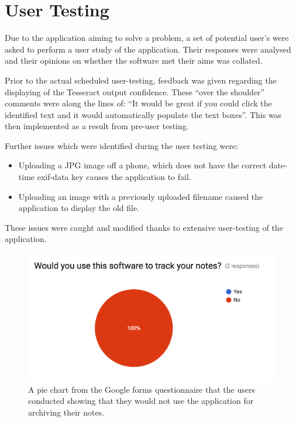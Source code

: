 \section{User Testing}
Due to the application aiming to solve a problem, a set of potential user's were asked to perform a user study of the application. Their responses were analysed and their opinions on whether the software met their aims was collated.

Prior to the actual scheduled user-testing, feedback was given regarding the displaying of the Tesseract output confidence. These ``over the shoulder'' comments were along the lines of: ``It would be great if you could click the identified text and it would automatically populate the text boxes''. This was then implemented as a result from pre-user testing.

Further issues which were identified during the user testing were:
\begin{itemize}
  \item Uploading a JPG image off a phone, which does not have the correct date-time exif-data key causes the application to fail.
  \item Uploading an image with a previously uploaded filename caused the application to display the old file.
\end{itemize}

These issues were caught and modified thanks to extensive user-testing of the application.

\begin{figure}[h!]
  \centering
  \includegraphics[scale=0.5]{images/user_response}
  \caption{A pie chart from the Google forms questionnaire that the users conducted showing that they would not use the application for archiving their notes.}
  \label{fig:user_response}
\end{figure}

